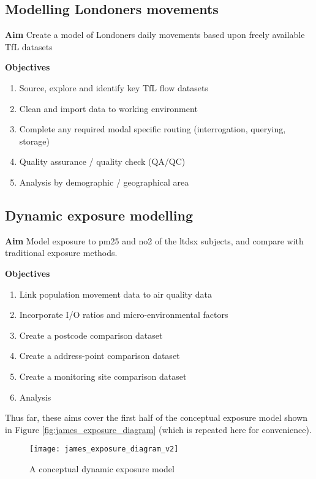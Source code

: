 \subsection{Modelling Londoners movements}
\label{sec:modelling_londoners_movements}

\textbf{Aim} Create a model of Londoners daily movements based upon freely available TfL datasets

\textbf{Objectives}

\begin{enumerate}
\item Source, explore and identify key TfL flow datasets
\item Clean and import data to working environment
\item Complete any required modal specific routing (interrogation, querying, storage)
\item Quality assurance / quality check (QA/QC)
\item Analysis by demographic / geographical area
\end{enumerate}

\subsection{Dynamic exposure modelling}
\label{sec:dynamic_exposure_modelling}

\textbf{Aim} Model exposure to \gls{pm25} and \gls{no2} of the \gls{ltdsx} subjects, and compare with traditional exposure methods.

\textbf{Objectives}

\begin{enumerate}
\item Link population movement data to air quality data
\item Incorporate I/O ratios and micro-environmental factors
\item Create a postcode comparison dataset
\item Create a address-point comparison dataset
\item Create a monitoring site comparison dataset
\item Analysis
\end{enumerate}

Thus far, these aims cover the first half of the conceptual exposure model shown in Figure \ref{fig:james_exposure_diagram} (which is repeated here for convenience). 

\begin{figure}[H]
\centering
\texttt{[image: james\_exposure\_diagram\_v2]}
\caption{A conceptual dynamic exposure model}
\label{fig:james_exposure_diagram_v2}
\end{figure}

